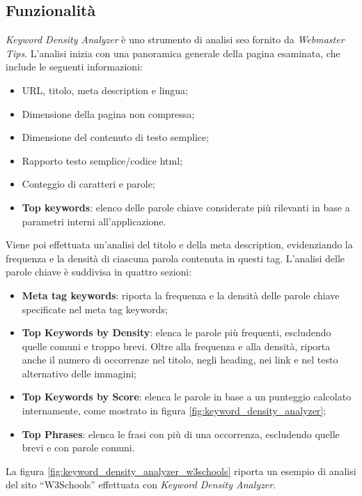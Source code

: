 \subsection{Funzionalità}
\par \textit{Keyword Density Analyzer} è uno strumento di analisi \gls{seo} fornito da \textit{Webmaster Tips}. L'analisi inizia con una panoramica generale della pagina esaminata, che include le seguenti informazioni:
\begin{itemize}
    \item URL, titolo, meta description e lingua;
    \item Dimensione della pagina non compressa;
    \item Dimensione del contenuto di testo semplice;
    \item Rapporto testo semplice/codice \gls{html};
    \item Conteggio di caratteri e parole;
    \item \textbf{Top keywords}: elenco delle parole chiave considerate più rilevanti in base a parametri interni all'applicazione.
\end{itemize}
\vspace{5pt}
\par\noindent Viene poi effettuata un'analisi del titolo e della meta description, evidenziando la frequenza e la densità di ciascuna parola contenuta in questi tag. L'analisi delle parole chiave è suddivisa in quattro sezioni:
\begin{itemize}
    \item \textbf{Meta tag keywords}: riporta la frequenza e la densità delle parole chiave specificate nel meta tag keywords;
    \item \textbf{Top Keywords by Density}: elenca le parole più frequenti, escludendo quelle comuni e troppo brevi. Oltre alla frequenza e alla densità, riporta anche il numero di occorrenze nel titolo, negli heading, nei link e nel testo alternativo delle immagini;
    \item \textbf{Top Keywords by Score}: elenca le parole in base a un punteggio calcolato internamente, come mostrato in figura \ref{fig:keyword_density_analyzer};
    \item \textbf{Top Phrases}: elenca le frasi con più di una occorrenza, escludendo quelle brevi e con parole comuni.
\end{itemize}

\vspace{10pt}
\par\noindent La figura \ref{fig:keyword_density_analyzer_w3schools} riporta un esempio di analisi del sito “W3Schools” effettuata con \textit{Keyword Density Analyzer}.

